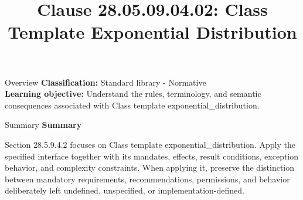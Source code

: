 \documentclass[10pt,letterpaper]{article}
\title{Clause 28.05.09.04.02: Class Template Exponential Distribution}
\author{}
\date{}
\begin{document}
\maketitle
\begin{CornellOverviewBox}{Overview}
\textbf{Classification:} Standard library - Normative\\[2pt]
\textbf{Learning objective:} Understand the rules, terminology, and semantic consequences associated with Class template exponential\_distribution.
\end{CornellOverviewBox}\begin{CornellSummaryBox}{Summary}
{\sffamily\bfseries\color{Accent} Summary}\par\vspace{3pt}Section 28.5.9.4.2 focuses on Class template exponential\_distribution. Apply the specified interface together with its mandates, effects, result conditions, exception behavior, and complexity constraints. When applying it, preserve the distinction between mandatory requirements, recommendations, permissions, and behavior deliberately left undefined, unspecified, or implementation-defined.
\end{CornellSummaryBox}
\end{document}

